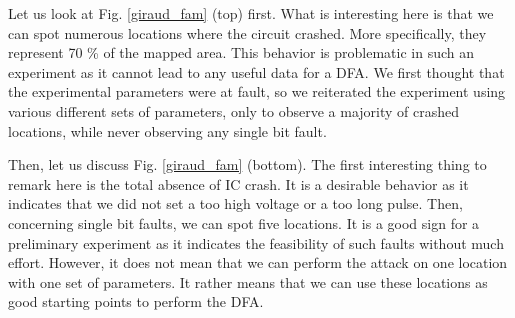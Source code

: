 			Let us look at Fig. \ref{giraud_fam} (top) first.
			What is interesting here is that we can spot numerous locations where the circuit crashed.
			More specifically, they represent 70 \% of the mapped area.
			This behavior is problematic in such an experiment as it cannot lead to any useful data for a DFA.
			We first thought that the experimental parameters were at fault, so we reiterated the experiment using various different sets of parameters, only to observe a majority of crashed locations, while never observing any single bit fault.

			Then, let us discuss Fig. \ref{giraud_fam} (bottom).
			The first interesting thing to remark here is the total absence of IC crash.
			It is a desirable behavior as it indicates that we did not set a too high voltage or a too long pulse.
			Then, concerning single bit faults, we can spot five locations.
			It is a good sign for a preliminary experiment as it indicates the feasibility of such faults without much effort.
			However, it does not mean that we can perform the attack on one location with one set of parameters.
			It rather means that we can use these locations as good starting points to perform the DFA.

